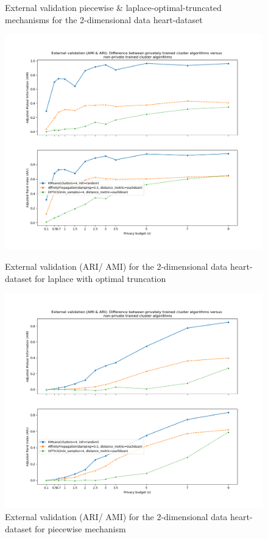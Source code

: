 \begin{figure}[!htbp]
\end{figure}
\begin{figure}[!htbp]
    \caption{External validation piecewise \& laplace-optimal-truncated mechanisms for the 2-dimensional data heart-dataset}
    \centering
    \begin{minipage}[c]{0.49\textwidth}
        \includegraphics[width=1\textwidth]{Results/2d-laplace-optimal-truncated/heart-dataset/ami-and-ari.png}
        \caption{External validation (ARI/ AMI) for the 2-dimensional data heart-dataset for laplace with optimal truncation}
        \label{fig:external-validation-heart-dataset_comparison_2d-laplace}
    \end{minipage}
    \begin{minipage}[c]{0.49\textwidth}
        \includegraphics[width=1\textwidth]{Results/2d-piecewise/heart-dataset/ami-and-ari.png}
        \caption{External validation (ARI/ AMI) for the 2-dimensional data heart-dataset for piecewise mechanism}
        \label{fig:external-validation-heart-dataset_comparison_2d-piecewise}
    \end{minipage}
\end{figure}
